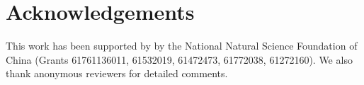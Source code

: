 \vspace{-1.8em}
\section*{Acknowledgements}
\vspace{-1em}

This work has been supported by by the National Natural Science Foundation of
China (Grants 61761136011, 61532019, 61472473, 61772038, 61272160).
We also thank anonymous reviewers for detailed comments.

